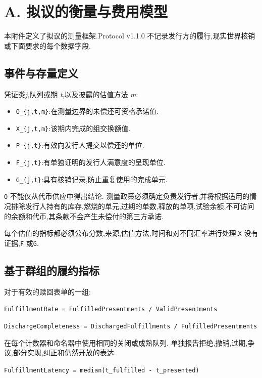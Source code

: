 \documentclass[11pt]{article}
\begin{document}
\section*{A. 拟议的衡量与费用模型}

本附件定义了拟议的测量框架.Protocol v1.1.0 不记录发行方的履行,现实世界核销或下面要求的每个数据字段.

\subsection*{事件与存量定义}

凭证类\emph{j},队列或期 \emph{t},以及披露的估值方法 \emph{m}:

\begin{itemize}[leftmargin=*]
\item \texttt{O\_\{j,t,m\}}:在测量边界的未偿还可资格承诺值.
\item \texttt{X\_\{j,t,m\}}:该期内完成的组交换额值.
\item \texttt{P\_\{j,t\}}:有效向发行人提交以偿还的单位.
\item \texttt{F\_\{j,t\}}:有单独证明的发行人满意度的呈现单位.
\item \texttt{G\_\{j,t\}}:具有核销记录,防止重复使用的完成单元.
\end{itemize}
\texttt{O} 不能仅从代币供应中得出结论. 测量政策必须确定负责发行者,并将根据适用的情况排除发行人持有的库存,燃烧的单元,过期的单数,释放的单项,试验余额,不可访问的余额和代币,其条款不会产生未偿付的第三方承诺.

每个估值的指标都必须公布分数,来源,估值方法,时间和对不同汇率进行处理.\texttt{X} 没有证据,\texttt{F} 或\texttt{G}.

\subsection*{基于群组的履约指标}

对于有效的赎回表单的一组:

\texttt{FulfillmentRate = FulfilledPresentments / ValidPresentments}

\texttt{DischargeCompleteness = DischargedFulfillments / FulfilledPresentments}

在每个计数器和命名器中使用相同的关闭或成熟队列. 单独报告拒绝,撤销,过期,争议,部分实现,纠正和仍然开放的表达.

\texttt{FulfillmentLatency = median(t\_fulfilled - t\_presented)}
\end{document}
